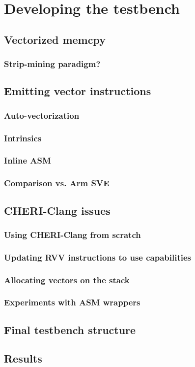 \section{Developing the testbench}\label{chap:software:sec:testbench}

\subsection{Vectorized memcpy}

\subsubsection{Strip-mining paradigm?}

\subsection{Emitting vector instructions}
\subsubsection{Auto-vectorization}
\subsubsection{Intrinsics}
\subsubsection{Inline ASM}
\subsubsection{Comparison vs. Arm SVE}

\subsection{CHERI-Clang issues}
\subsubsection{Using CHERI-Clang from scratch}
\subsubsection{Updating RVV instructions to use capabilities}
\subsubsection{Allocating vectors on the stack}
\subsubsection{Experiments with ASM wrappers}

\subsection{Final testbench structure}

\subsection{Results}